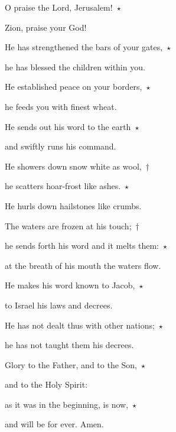 \noindent O praise the Lord, Jerusalem!~$\star$~\nopagebreak

Zion, praise your God!

\noindent He has strengthened the bars of your gates,~$\star$~\nopagebreak

he has blessed the children within you.

\noindent He established peace on your borders,~$\star$~\nopagebreak

he feeds you with finest wheat.

\noindent He sends out his word to the earth~$\star$~\nopagebreak

and swiftly runs his command.

\noindent He showers down snow white as wool,~†~\nopagebreak

he scatters hoar-frost like ashes.~$\star$~\nopagebreak

He hurls down hailstones like crumbs.

\noindent The waters are frozen at his touch;~†~\nopagebreak

he sends forth his word and it melts them:~$\star$~\nopagebreak

at the breath of his mouth the waters flow.

\noindent He makes his word known to Jacob,~$\star$~\nopagebreak

to Israel his laws and decrees.

\noindent He has not dealt thus with other nations;~$\star$~\nopagebreak

he has not taught them his decrees.

\noindent Glory to the Father, and to the Son,~$\star$~\nopagebreak

and to the Holy Spirit:

\noindent as it was in the beginning, is now,~$\star$~\nopagebreak

and will be for ever. Amen.
